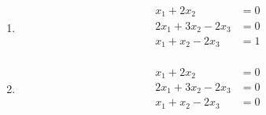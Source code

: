 \begin{ExerciseBlock}
\begin{enumerate}[label=\alph*),itemsep=0pt,parsep=0pt,topsep=0pt]
	\item 
	\begin{equation*}
	\begin{split}
		x_1 + 2 x_2 &= 0 \\
 		2 x_1 + 3 x_2 - 2 x_3 &= 0 \\
 		x_1 + x_2 - 2 x_3 &= 1 \\
	\end{split}
	\end{equation*}

	\item 
	\begin{equation*}
	\begin{split}
		x_1 + 2 x_2 &= 0 \\
 		2 x_1 + 3 x_2 - 2 x_3 &= 0 \\
 		x_1 + x_2 - 2 x_3 &= 0 \\
	\end{split}
	\end{equation*}

\end{enumerate}

\end{ExerciseBlock}
